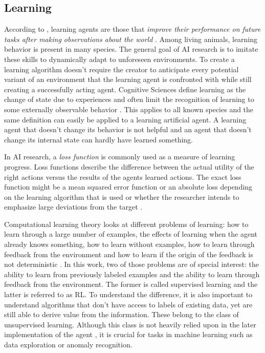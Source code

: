 \subsection{Learning}
\label{sec:learning}

According to \citep{russell2016artificial}, learning agents are those that \emph{improve their performance on future
tasks after making observations about the world} \cite[p.693]{russell2016artificial}. Among living animals, learning
behavior is present in many species. The general goal of \ac{AI} research is to imitate these
skills to dynamically adapt
to unforeseen environments. To create a learning algorithm doesn't require the creator to anticipate every
potential variant of an environment that the learning agent is confronted with while still creating a successfully
acting agent. Cognitive Sciences define learning as the change of state due to experiences and often limit the
recognition of learning to some externally observable behavior \cite[p.96f.]{cognition1999}. This applies to all known
species and the same definition can easily be applied to a learning artificial agent. A learning agent that doesn't
change its behavior is not helpful and an agent that doesn't change its internal state can hardly have learned
something.

In \ac{AI} research, a \emph{loss function} is commonly used as a measure of learning progress. Loss functions describe
the difference between the actual utility of the right actions versus the results of the agents learned actions. The
exact loss function might be a mean squared error function or an absolute loss depending on the learning algorithm that
is used or whether the researcher intends to emphasize large deviations from the target \cite[p.710]{russell2016artificial}.

Computational learning theory looks at different problems of learning: how to learn through a large number of
examples, the effects of learning when the agent already knows something, how to learn without examples, how to learn
through feedback from the environment and how to learn if the origin of the feedback is not deterministic
\cite[]{russell2016artificial}. In this work, two of those problems are of special interest: the ability to learn from
previously labeled examples and the ability to learn through feedback from the environment. The former is called
supervised learning and the latter is referred to as \acl{RL}. To understand the difference, it is also important to
understand algorithms that don't have access to labels of existing data, yet are still able to derive value from the
information. These belong to the class of unsupervised learning. Although this class is not heavily relied upon in the
later implementation of the agent , it is crucial for tasks in machine learning such as data exploration or anomaly
recognition.

